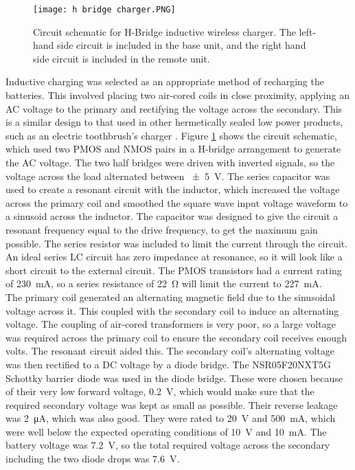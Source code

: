 \begin{figure}[htb]
	\centering
	\texttt{[image: h bridge charger.PNG]}
	\caption{Circuit schematic for H-Bridge inductive wireless charger. The left-hand side circuit is included in the base unit, and the right hand side circuit is included in the remote unit.}
	\label{fig: charger schematic}
\end{figure}
	

Inductive charging was selected as an appropriate method of recharging the batteries. This involved placing two air-cored coils in close proximity, applying an AC voltage to the primary and rectifying the voltage across the secondary. This is a similar design to that used in other hermetically sealed low power products, such as an electric toothbrush's charger \cite{wireless_power_review}. Figure \ref{fig: charger schematic} shows the circuit schematic, which used two PMOS and NMOS pairs in a H-bridge arrangement to generate the AC voltage. The two half bridges were driven with inverted signals, so the voltage across the load alternated between \SI{\pm 5}{\volt}. The series capacitor was used to create a resonant circuit with the inductor, which increased the voltage across the primary coil and smoothed the square wave input voltage waveform to a sinusoid across the inductor. The capacitor was designed to give the circuit a resonant frequency equal to the drive frequency, to get the maximum gain possible. The series resistor was included to limit the current through the circuit. An ideal series LC circuit has zero impedance at resonance, so it will look like a short circuit to the external circuit. The PMOS transistors had a current rating of \SI{230}{\milli\ampere}, so a series resistance of \SI{22}{\ohm} will limit the current to \SI{227}{\milli\ampere}.\\

The primary coil generated an alternating magnetic field due to the sinusoidal voltage across it. This coupled with the secondary coil to induce an alternating voltage. The coupling of air-cored transformers is very poor, so a large voltage was required across the primary coil to ensure the secondary coil receives enough volts. The resonant circuit aided this. The secondary coil's alternating voltage was then rectified to a DC voltage by a diode bridge. The NSR05F20NXT5G Schottky barrier diode \cite{original_diode} was used in the diode bridge. These were chosen because of their very low forward voltage, \SI{0.2}{\volt}, which would make sure that the required secondary voltage was kept as small as possible. Their reverse leakage was \SI{2}{\micro\ampere}, which was also good. They were rated to \SI{20}{\volt} and \SI{500}{\milli\ampere}, which were well below the expected operating conditions of \SI{10}{\volt} and \SI{10}{\milli\ampere}. The battery voltage was \SI{7.2}{\volt}, so the total required voltage across the secondary including the two diode drops was \SI{7.6}{\volt}.\\

